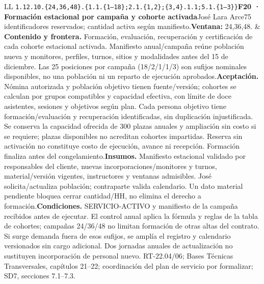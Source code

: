 \begin{longtable}{L{\tabcolsep\relax}L{\tabcolsep\relax}}
\texttt{1.\allowbreak{}12.\allowbreak{}10.\allowbreak{}\{24,\allowbreak{}36,\allowbreak{}48\}.\allowbreak{}\{1.\allowbreak{}1.\allowbreak{}\{1--18\};\allowbreak{}2.\allowbreak{}1.\allowbreak{}\{1,\allowbreak{}2\};\allowbreak{}\{3,\allowbreak{}4\}.\allowbreak{}1.\allowbreak{}1;\allowbreak{}5.\allowbreak{}1.\allowbreak{}\{1--3\}\}}\newline{}\textbf{F20 · Formación estacional por campaña y cohorte activada}\newline{}José Lara Arce\newline{}75 identificadores reservados; cantidad activa según manifiesto.\newline{}\textbf{Ventana:} 24,36,48. & \textbf{Contenido y frontera.} Formación, evaluación, recuperación y certificación de cada cohorte estacional activada. Manifiesto anual/campaña reúne población nueva y monitores, perfiles, turnos, sitios y modalidades antes del 15 de diciembre. Las 25 posiciones por campaña (18/2/1/1/3) son sufijos nominales disponibles, no una población ni un reparto de ejecución aprobados.\newline{}\textbf{Aceptación.} Nómina autorizada y población objetivo tienen fuente/versión; cohortes se calculan por grupos compatibles y capacidad efectiva, con límite de doce asistentes, sesiones y objetivos según plan. Cada persona objetivo tiene formación/evaluación y recuperación identificadas, sin duplicación injustificada. Se conserva la capacidad ofrecida de 300 plazas anuales y ampliación sin costo si se requiere; plazas disponibles no acreditan cohortes impartidas. Reserva sin activación no constituye costo de ejecución, avance ni recepción. Formación finaliza antes del congelamiento.\newline{}\textbf{Insumos.} Manifiesto estacional validado por responsables del cliente, nuevas incorporaciones/monitores y turnos, material/versión vigentes, instructores y ventanas admisibles. José solicita/actualiza población; contraparte valida calendario. Un dato material pendiente bloquea cerrar cantidad/HH, no elimina el derecho a formación.\newline{}\textbf{Condiciones.} SERVICIO-ACTIVO y manifiesto de la campaña recibidos antes de ejecutar. El control anual aplica la fórmula y reglas de la tabla de cohortes; campañas 24/36/48 no limitan formación de otras altas del contrato. Si surge demanda fuera de esos sufijos, se amplía el registro y calendario versionados sin cargo adicional. Dos jornadas anuales de actualización no sustituyen incorporación de personal nuevo. RT-22.04/06; Bases Técnicas Transversales, capítulos 21--22; coordinación del plan de servicio por formalizar; SD7, secciones 7.1--7.3.\\\hline

\end{longtable}

